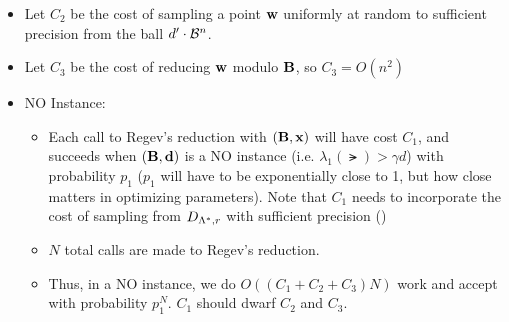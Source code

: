 \begin{itemize}
\item Let $C_2$ be the cost of sampling a point $\mathbf{w}$ uniformly at
  random to sufficient
  precision from the ball $d' \cdot \mathcal{B}^{n}$.
\item Let $C_3$ be the cost of reducing $\mathbf{w}$ modulo $\mathbf{B}$, so $C_3=O(n^2)$ 
\item NO Instance:
\begin{itemize}
\item Each call to Regev's reduction with $(\mathbf{B},\mathbf{x})$ will have cost $C_1$, and
  succeeds when $(\mathbf{B},\mathbf{d})$ is a NO instance
  (i.e. $\lambda_{1}(\lat) > \gamma d$) with probability $p_1$ ($p_1$ will
  have to be exponentially close to 1, but how close matters in
  optimizing parameters). Note that $C_1$ needs to incorporate the cost of
  sampling from $D_{\Lambda^*,r}$ with sufficient precision ()

\item $N$ total calls are made to Regev's reduction.
\item Thus, in a NO instance, we do $O((C_1+C_2+C_3)N)$ work and accept with
  probability $p_1^{N}$. $C_1$ should dwarf $C_2$ and $C_3$. 
\end{itemize} 

\end{itemize}



